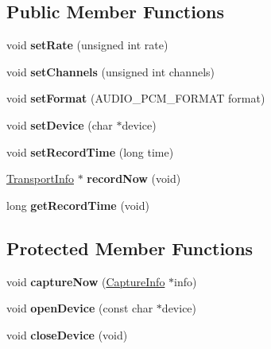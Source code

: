 \subsection*{Public Member Functions}
\begin{DoxyCompactItemize}
\item 
\mbox{\label{classAlexaEvent_1_1Recorder_a63721824d3fa6fa3ba0019ccf80adac7}} 
void {\bfseries set\+Rate} (unsigned int rate)
\item 
\mbox{\label{classAlexaEvent_1_1Recorder_af3ca0d36189c4b96ba53c4a4212ac855}} 
void {\bfseries set\+Channels} (unsigned int channels)
\item 
\mbox{\label{classAlexaEvent_1_1Recorder_a4bf708143bbe2b682dbcf1fe849019e8}} 
void {\bfseries set\+Format} (A\+U\+D\+I\+O\+\_\+\+P\+C\+M\+\_\+\+F\+O\+R\+M\+AT format)
\item 
\mbox{\label{classAlexaEvent_1_1Recorder_a28f7f904c288f62bffc068dd7363c9a2}} 
void {\bfseries set\+Device} (char $\ast$device)
\item 
\mbox{\label{classAlexaEvent_1_1Recorder_a1a5e45eddd171fe7dd1d93c17bfe6fd1}} 
void {\bfseries set\+Record\+Time} (long time)
\item 
\mbox{\label{classAlexaEvent_1_1Recorder_aa3a574185d0cec0abaff2e6dc71b43db}} 
\hyperlink{classAlexaEvent_1_1TransportInfo}{Transport\+Info} $\ast$ {\bfseries record\+Now} (void)
\item 
\mbox{\label{classAlexaEvent_1_1Recorder_a1138b10a99d18df537217568b1f6d702}} 
long {\bfseries get\+Record\+Time} (void)
\end{DoxyCompactItemize}
\subsection*{Protected Member Functions}
\begin{DoxyCompactItemize}
\item 
\mbox{\label{classAlexaEvent_1_1Recorder_a5818d10cbe26c399645bef25b6057870}} 
void {\bfseries capture\+Now} (\hyperlink{structAlexaEvent_1_1CaptureInfo}{Capture\+Info} $\ast$info)
\item 
\mbox{\label{classAlexaEvent_1_1Recorder_a8f17c6bba34df2df80791687eee658d1}} 
void {\bfseries open\+Device} (const char $\ast$device)
\item 
\mbox{\label{classAlexaEvent_1_1Recorder_a1788911e74fcf60188e7026d0f0d18ed}} 
void {\bfseries close\+Device} (void)
\end{DoxyCompactItemize}
